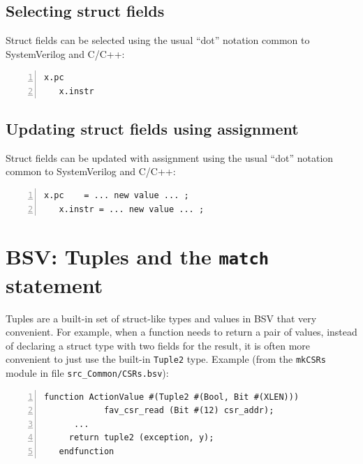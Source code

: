 \subsection{Selecting struct fields}


Struct fields can be selected using the usual ``dot'' notation common
to SystemVerilog and C/C++:

{\small
\begin{Verbatim}[frame=single, numbers=left]
   x.pc
   x.instr
\end{Verbatim}
}



\subsection{Updating struct fields using assignment}


Struct fields can be updated with assignment using the usual ``dot''
notation common to SystemVerilog and C/C++:

{\small
\begin{Verbatim}[frame=single, numbers=left]
   x.pc    = ... new value ... ;
   x.instr = ... new value ... ;
\end{Verbatim}
}


\section{BSV: Tuples and the {\tt match} statement}

\label{Sec_Tuples}


Tuples are a built-in set of struct-like types and values in BSV that
very convenient.  For example, when a function needs to return a pair
of values, instead of declaring a struct type with two fields for the
result, it is often more convenient to just use the built-in
\verb|Tuple2| type.  Example (from the \verb|mkCSRs| module in file
\verb|src_Common/CSRs.bsv|):

{\small
\begin{Verbatim}[frame=single, numbers=left]
   function ActionValue #(Tuple2 #(Bool, Bit #(XLEN)))
            fav_csr_read (Bit #(12) csr_addr);
      ...
	 return tuple2 (exception, y);
   endfunction
\end{Verbatim}
}

